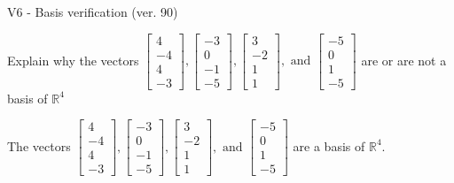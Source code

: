 \begin{exercise}
  \begin{exerciseTitle}V6 - Basis verification (ver. 90)\end{exerciseTitle}
  \begin{exerciseStatement}
    Explain why the vectors \(\left[\begin{array}{r}
4 \\
-4 \\
4 \\
-3
\end{array}\right] , \left[\begin{array}{r}
-3 \\
0 \\
-1 \\
-5
\end{array}\right] , \left[\begin{array}{r}
3 \\
-2 \\
1 \\
1
\end{array}\right] , \text{ and } \left[\begin{array}{r}
-5 \\
0 \\
1 \\
-5
\end{array}\right]\) are or are not a basis of \(\mathbb{R}^4\)	


  \end{exerciseStatement}
  \begin{exerciseAnswer}
   The vectors \(\left[\begin{array}{r}
4 \\
-4 \\
4 \\
-3
\end{array}\right] , \left[\begin{array}{r}
-3 \\
0 \\
-1 \\
-5
\end{array}\right] , \left[\begin{array}{r}
3 \\
-2 \\
1 \\
1
\end{array}\right] , \text{ and } \left[\begin{array}{r}
-5 \\
0 \\
1 \\
-5
\end{array}\right]\) 
  	 are  a basis of \(\mathbb{R}^4\).
  


  \end{exerciseAnswer}
\end{exercise}